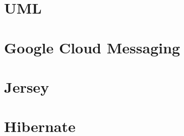 	\section{UML}
		
	
	\section{Google Cloud 	Messaging}
		
	
	\section{Jersey}
		
	
	\section{Hibernate}
		

%
%
	



				





